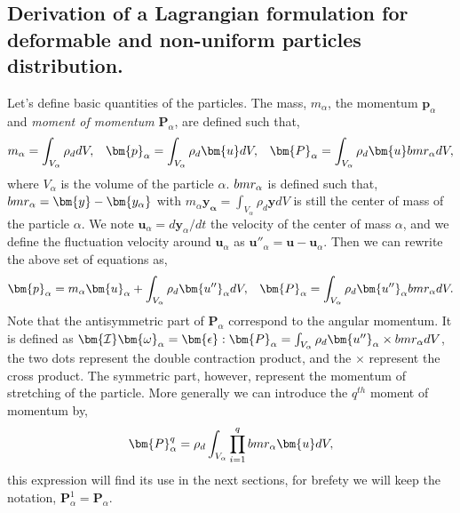 \subsection{Derivation of a Lagrangian formulation for deformable and non-uniform particles distribution.}
Let's define basic quantities of the particles. 
The mass, $m_\alpha$, the momentum $\bm{p}_\alpha$ and \textit{moment of momentum} $\bm{P}_\alpha$,
are defined such that,
\begin{equation}
    m_\alpha = \int_{V_\alpha} \rho_d dV,\;\;\;
    \bm{p}_\alpha = \int_{V_\alpha} \rho_d \bm{u} dV,\;\;\;
    \bm{P}_\alpha = \int_{V_\alpha} \rho_d \bm{u}\\bm{r}_\alpha dV,
\end{equation}
where $V_\alpha$ is the volume of the particle $\alpha$.
$\\bm{r}_\alpha$ is defined such that, $\\bm{r}_\alpha = \bm{y} - \bm{y_\alpha}$ with $m_\alpha\bm{y_\alpha} = \int_{V_\alpha} \rho_d\bm{y}dV$ is still the center of mass of the particle $\alpha$. 
We note $\bm{u}_\alpha = d\bm{y}_\alpha/dt$ the velocity of the center of mass $\alpha$, and we define the fluctuation velocity around $\bm{u}_\alpha$ as $\bm{u''}_\alpha = \bm{u} - \bm{u}_\alpha$.
Then we can rewrite the above set of equations as, 
\begin{equation}
    \bm{p}_\alpha = m_\alpha \bm{u}_\alpha 
    + \int_{V_\alpha} \rho_d \bm{u''}_\alpha dV,\;\;\;
    \bm{P}_\alpha = \int_{V_\alpha} \rho_d \bm{u''}_\alpha\\bm{r}_\alpha dV.
    \label{eq:decomposition}
\end{equation}
Note that the antisymmetric part of  $\bm{P}_\alpha$ correspond to the angular momentum. 
It is defined as $\bm{\mathcal{I}}\bm{\omega}_\alpha = \bm{\epsilon} : \bm{P}_\alpha =\int_{V_\alpha}\rho_d \bm{u''}_\alpha \times \\bm{r}_\alpha dV $, the two dots represent the double contraction product, and the $\times$ represent the cross product.
The symmetric part, however, represent the momentum of stretching of the particle.
More generally we can introduce the $q^{th}$ moment of momentum by,
\begin{equation}
    \bm{P}_\alpha^q =  \rho_d\int_{V_\alpha}\prod^q_{i=1} \\bm{r}_\alpha \bm{u} dV,
    \label{eq:qthmoment}
\end{equation}
this expression will find its use in the next sections, for brefety we will keep the notation, $\bm{P}_\alpha^1 =\bm{P}_\alpha$. 
